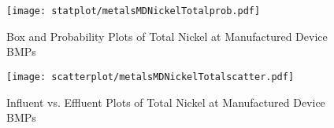         \begin{figure}[hb]   %
            \centering
            \texttt{[image: statplot/metalsMDNickelTotalprob.pdf]}
            \caption{Box and Probability Plots of Total Nickel at Manufactured Device BMPs}
        \end{figure}         %
        
        
        \begin{figure}[hb]   %
            \centering
            \texttt{[image: scatterplot/metalsMDNickelTotalscatter.pdf]}
            \caption{Influent vs. Effluent Plots of Total Nickel at Manufactured Device BMPs}
        \end{figure}         %
        \clearpage
        